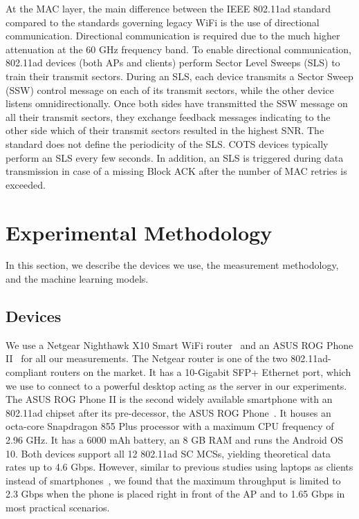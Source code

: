 \documentclass[sigconf,anonymous]{acmart}
\begin{document}
At the MAC layer, the main difference between the IEEE 802.11ad
standard compared to the standards governing legacy WiFi is the use of
directional communication. Directional communication is required due
to the much higher attenuation at the 60 GHz frequency band. To enable
directional communication, 802.11ad devices (both APs and clients)
perform Sector Level Sweeps (SLS) to train their transmit
sectors. During an SLS, each device transmits a Sector Sweep (SSW)
control message on each of its transmit sectors, while the other
device listens omnidirectionally. Once both sides have transmitted the
SSW message on all their transmit sectors, they exchange feedback
messages indicating to the other side which of their transmit sectors
resulted in the highest SNR. The standard does not define the
periodicity of the SLS. COTS devices typically perform an SLS every few
seconds. In addition, an SLS is triggered during data transmission in
case of a missing Block ACK after the number of MAC retries is
exceeded.


\section{Experimental Methodology} %

In this section, we describe the devices we use, the measurement methodology, and the machine learning models.

\subsection{Devices}

We use a Netgear Nighthawk X10 Smart WiFi router~\cite{netgear-x10} and an ASUS ROG Phone II~\cite{rog-phone-2} for all our measurements. The Netgear router is one of the two 802.11ad-compliant routers on the market. It has a 10-Gigabit SFP+ Ethernet port, which we use to connect to a powerful desktop acting as the server in our experiments. The ASUS ROG Phone II is the second widely available smartphone with an 802.11ad chipset after its pre-decessor, the ASUS ROG Phone~\cite{rog-phone}. It houses an octa-core Snapdragon 855 Plus processor with a maximum CPU frequency of 2.96 GHz. It has a 6000 mAh battery, an 8 GB RAM and runs the Android OS 10. Both devices support all 12 802.11ad SC MCSs, yielding theoretical data rates up to 4.6 Gbps. However, similar to previous studies using laptops as clients instead of smartphones~\cite{sur:mobicom2017,saha:secon2018,baig:mobicom2019,saha:mobicom2019}, we found that the maximum throughput is limited to 2.3 Gbps when the phone is placed right in front of the AP and to 1.65 Gbps in most practical scenarios.
\end{document}
